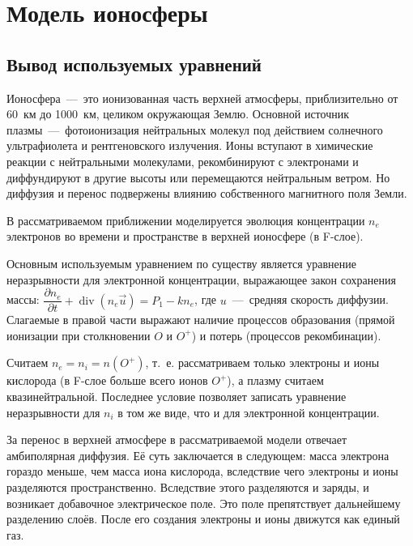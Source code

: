 \documentclass[14pt, a4paper, fleqn]{extarticle}
\renewcommand{\div}{\operatorname{div}}
\begin{document}
\section{Модель ионосферы}

\subsection{Вывод используемых уравнений}

Ионосфера~---~это ионизованная часть верхней атмосферы, приблизительно от 60~км до 1000~км, целиком окружающая Землю. Основной источник плазмы~---~фотоионизация нейтральных молекул под действием солнечного ультрафиолета и рентгеновского излучения. Ионы вступают в химические реакции с нейтральными молекулами, рекомбинируют с электронами и диффундируют в другие высоты или перемещаются нейтральным ветром. Но диффузия и перенос подвержены влиянию собственного магнитного поля Земли.

\medskip

В рассматриваемом приближении моделируется эволюция концентрации $n_e$ электронов во времени и пространстве в верхней ионосфере (в F-слое).

\medskip

Основным используемым уравнением по существу является уравнение неразрывности для электронной концентрации, выражающее закон сохранения массы: $\dfrac{\partial n_e}{\partial t}+\div(n_e \vec{u})=P_1-kn_e$, где $u$~---~средняя скорость диффузии. Слагаемые в правой части выражают наличие процессов образования (прямой ионизации при столкновении $O$ и $O^+$) и потерь (процессов рекомбинации).

Считаем $n_e=n_i = n(O^+)$, т.~е. рассматриваем только электроны и ионы кислорода (в F-слое больше всего ионов $O^+$), а плазму считаем квазинейтральной. Последнее условие позволяет записать уравнение неразрывности для $n_i$ в том же виде, что и для электронной концентрации.

\medskip

За перенос в верхней атмосфере в рассматриваемой модели отвечает амбиполярная диффузия. Её суть заключается в следующем: масса электрона гораздо меньше, чем масса иона кислорода, вследствие чего электроны и ионы разделяются пространственно. Вследствие этого разделяются и заряды, и возникает добавочное электрическое поле. Это поле препятствует дальнейшему разделению слоёв. После его создания электроны и ионы движутся как единый газ.
\end{document}
